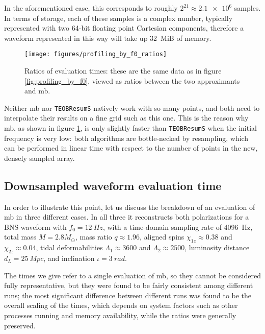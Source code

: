 \documentclass[main.tex]{subfiles}
\begin{document}
In the aforementioned case, this corresponds to roughly \(2^{21} \approx \num{2.1e6}\) samples. In terms of storage, each of these samples is a complex number, typically represented with two 64-bit floating point Cartesian components, therefore a waveform represented in this way will take up \SI{32}{MiB} of memory.

\begin{figure}[ht]
\centering
\texttt{[image: figures/profiling\_by\_f0\_ratios]}
\caption{Ratios of evaluation times: these are the same data as in figure \ref{fig:profiling_by_f0}, viewed as ratios between the two approximants and \ac{mb}. }
\label{fig:profiling_by_f0_ratios}
\end{figure}

Neither \ac{mb} nor \texttt{TEOBResumS} natively work with so many points, and both need to interpolate their results on a fine grid such as this one. 
This is the reason why \ac{mb}, as shown in figure \ref{fig:profiling_by_f0_ratios}, is only slightly faster than \texttt{TEOBResumS} when the initial frequency is very low: both algorithms are bottle-necked by resampling, which can be performed in linear time with respect to the number of points in the new, densely sampled array. 

\subsection{Downsampled waveform evaluation time} \label{sec:downsampled-evaluation}

In order to illustrate this point, let us discuss the breakdown of an evaluation of \ac{mb} in three different cases.
In all three it reconstructs both polarizations for a \ac{BNS} waveform with \(f_0 = \SI{12}{Hz}\), with a time-domain sampling rate of \SI{4096}{Hz}, total mass \(M = 2.8M_{\odot}\), mass ratio \(q \approx 1.96\), aligned spins \(\chi_{1z} \approx 0.38\) and \(\chi_{2z} \approx 0.04\), tidal deformabilities \(\Lambda_1 \approx 3600 \) and \(\Lambda_2 \approx 2500\), luminosity distance \(d_L = \SI{25}{Mpc}\), and inclination \(\iota = \SI{3}{rad}\).

The times we give refer to a single evaluation of \ac{mb}, so they cannot be considered fully representative, but they were found to be fairly consistent among different runs; the most significant difference between different runs was found to be the overall scaling of the times, which depends on system factors such as other processes running and memory availability, while the ratios were generally preserved.
\end{document}
